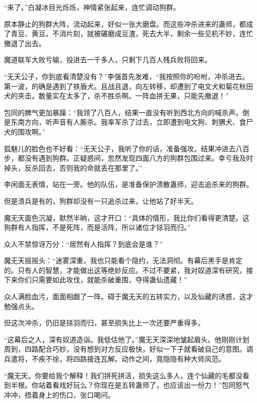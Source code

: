 
\begin{this_body}



“来了。”白凝冰目光烁烁，神情紧张起来，连忙调动狗群。

原本静止的狗群大阵，流动起来，好似一张大磨盘。而这些冲杀进来的蛊师，都成了青豆、黄豆。不消片刻，就被碾磨成豆渣，死去大半，剩余一些见机不妙，连忙撤退了出去。

魔道联军大败亏输，投进去一千多人，只剩下几百人残兵败将回来。

“无天公子，你到底看清楚没有？”李强首先发难，“我按照你的吩咐，冲杀进去。第一波，的确是遇到了铁盾犬。且战且退，向左转移，却遭到了电文犬和菊花秋田犬的夹击。数量实在太多了，杀不胜杀啊。一阵血拼无果，只能先撤退！”

包同的脾气更加暴躁：“我领了八百人，结果一直没有听到西北方向的喊杀声。倒是东南方向，听声音有人厮杀。我率军杀了过去，立即遭到电文狗、刺猬犬、食尸犬的围攻啊。”

狐魅儿的脸色也不好看：“无天公子，我听了你的话，准备强攻。结果冲进去八百步，都没有遇到狗群。正疑惑间，忽然发现四面八方的狗群包围过来。幸亏我及时掉头，反杀回去，否则我的命就丢在那里了。”

李闲面无表情，站在一旁。他的队伍，是准备保护溃散蛊师，迎击追杀来的狗群。

但是溃兵是有的，狗群却没有一只追杀过来，让他站了好半天。

魔无天面色沉凝，默然半晌，这才开口：“具体的情形，我比你们看得更清楚。这狗群有人指挥，不是死阵，而是活阵，所以诸位才铩羽而归。”

众人不禁惊讶万分：“居然有人指挥？到底会是谁？”

魔无天摇摇头：“迷雾深重，我也只能看个隐约，无法洞彻。有幕后黑手是肯定的。只有人的智慧，才能做出这等绝妙反应。不过不要紧，我对奴道深有研究，接下来你们只需要如此攻伐，就能杀破重围，夺得蛊仙遗藏！”

众人满脸血污，面面相觑了一阵。碍于魔无天的五转实力，以及仙藏的诱惑，这才勉强点头。

但这次冲杀，仍旧是铩羽而归，甚至损失比上一次还要严重得多。

“这幕后之人，深有奴道造诣。我低估他了。”魔无天深深地皱起眉头。他刚刚计划周到，四路配合巧妙，没有想到对方反应极快，好似一下子就看破自己的意图。调兵遣将，不疾不徐，将四路接连瓦解。动作之间，竟隐隐有种大师风范。

“魔无天。你要给我个解释！我们拼死拼活，损失这么多人，连个仙藏的毛都没看到半根。你站着看戏好玩么？你现在是五转蛊师了，也应该出一份力！”包同怒气冲冲，捂着身上的伤口，张口喝问。


\end{this_body}
